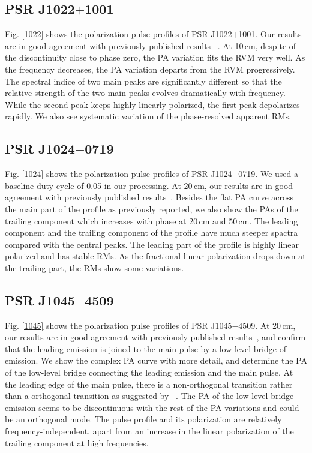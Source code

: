 \documentclass[useAMS,usenatbib]{mn2e}
\begin{document}
\begin{appendix}
\subsection{PSR J1022$+$1001}

Fig. \ref{1022} shows the polarization pulse profiles 
of PSR J1022$+$1001.
%
Our results are in good agreement with previously published results
~\citep{1022Kramer99,Stairs99,Ord04,Yan11}.
%
At 10\,cm, despite of the discontinuity close to phase zero, the PA variation 
fits the RVM very well. As the frequency decreases, the PA variation 
departs from the RVM progressively.
%
The spectral indice of two main peaks are significantly different so that 
the relative strength of the two main peaks evolves dramatically with 
frequency.
%
While the second peak keeps highly linearly polarized, the first peak 
depolarizes rapidly.
%
We also see systematic variation of the phase-resolved apparent RMs.


%
\subsection{PSR J1024$-$0719}

Fig. \ref{1024} shows the polarization pulse profiles of 
PSR J1024$-$0719.
%
We used a baseline duty cycle of 0.05 in our processing.
%
At 20\,cm, our results are in good agreement with previously published
results~\citep{Ord04,Yan11}. 
%
Besides the flat PA curve across the main part of the profile as 
previously reported, we also show the PAs of the trailing component which 
increases with phase at 20\,cm and 50\,cm.
%
The leading component and the trailing component of the profile have much 
steeper spactra compared with the central peaks. 
%
The leading part of the profile is highly linear polarized and has stable  
RMs. As the fractional linear polarization drops down at the 
trailing part, the RMs show some variations.

%
\subsection{PSR J1045$-$4509}

Fig. \ref{1045} shows the polarization pulse profiles of 
PSR J1045$-$4509.
%
At 20\,cm, our results are in good agreement with previously published
results~\citep{Yan11}, and confirm that the leading emission is joined to 
the main pulse by a low-level bridge of emission.
%
We show the complex PA curve with more detail, and determine the PA of the 
low-level bridge connecting the leading emission and the main pulse.
%
At the leading edge of the main pulse, there is a non-orthogonal transition 
rather than a orthogonal transition as suggested by ~\citet{Yan11}.
%
The PA of the low-level bridge emission seems to be discontinuous with 
the rest of the PA variations and could be an orthogonal mode.
%
The pulse profile and its polarization are relatively frequency-independent, 
apart from an increase in the linear polarization of the trailing 
component at high frequencies.


\end{appendix}
\end{document}
